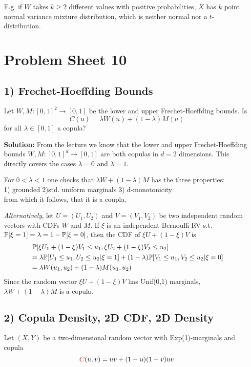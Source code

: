 E.g. if $W$ takes $k\geq 2$ different values with positive probabilities, $X$ has $k$ point normal variance mixture distribution, which is neither normal nor a $t$-distribution.


%
%
\section*{Problem Sheet 10}
%
%
\subsection*{1) Frechet-Hoeffding Bounds}
Let $W, M: [0,1]^2 \to [0,1]$ be the lower and upper Frechet-Hoeffding bounds. Is
\[
    C(u) = \lambda W(u) + (1-\lambda)M(u)
\]
for all $\lambda \in [0,1]$ a copula?

\textbf{Solution:}
From the lecture we know that the lower and upper Frechet-Hoeffding bounds $W, M:[0,1]^d \to [0,1]$
are both copulas in $d=2$ dimensions. This directly covers the cases $\lambda=0$ and $\lambda=1$.

For $0 < \lambda < 1$ one checks that $\lambda W + (1-\lambda)M$ has the three properties: \\
1) grounded 2)std. uniform marginals 3) d-monotonicity \\
from which it follows, that it is a coupla.

\textit{Alternatively}, let $U = (U_1, U_2)$ and $V = (V_1, V_2)$ be two independent random vectors
with CDFs $W$ and $M$. If $\xi$ is an independent Bernoulli RV s.t. $\mathbb{P}[\xi=1] = \lambda = 1 - \mathbb{P}[\xi = 0]$, then the CDF of $\xi U + (1-\xi) V$ is
\begin{align*}
    & \ \mathbb{P}[\xi U_1 + (1-\xi)V_1 \leq u_1, \xi U_2 + (1-\xi)V_2 \leq u_2] \\
    &= \lambda\mathbb{P}[U_1 \leq u_1, U_2\leq u_2 | \xi = 1] + (1-\lambda)\mathbb{P}[V_1 \leq u_1, V_2 \leq u_2 | \xi = 0] \\
    &= \lambda W(u_1, u_2) + ( 1 - \lambda ) M(u_1, u_2)
\end{align*}
Since the random vector $\xi U + ( 1 - \xi )V$ has Unif(0,1) marginals, $\lambda W + ( 1 - \lambda) M$ is a copula.

%
%
\subsection*{2) Copula Density, 2D CDF, 2D Density}
Let $(X,Y)$ be a two-dimensional random vector with Exp(1)-marginals and copula
\[
    \textcolor{red}{C}(u,v) = uv + (1-u)(1-v)uv
\]

